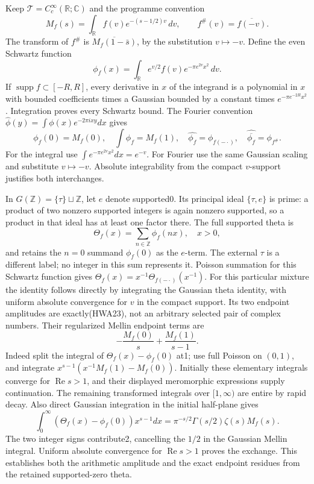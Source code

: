 \documentclass[
  10pt,
  a4paper,
]{article}
\begin{document}
Keep \(\mathcal T=C_c^\infty(\mathbb R;\mathbb C)\) and the programme
convention \[
M_f(s)=\int_{\mathbb R}f(v)e^{-(s-1/2)v}\,dv,
\qquad f^\#(v)=\overline{f(-v)}.
\tag{HWA21}
\] The transform of \(f^\#\) is \(\overline{M_f(1-\bar s)}\), by the
substitution \(v\mapsto-v\). Define the even Schwartz function \[
\phi_f(x)=\int_{\mathbb R}e^{v/2}f(v)e^{-\pi e^{2v}x^2}\,dv.
\tag{HWA22}
\] If \(\operatorname{supp}f\subset[-R,R]\), every derivative in \(x\)
of the integrand is a polynomial in \(x\) with bounded coefficients
times a Gaussian bounded by a constant times \(e^{-\pi e^{-2R}x^2}\).
Integration proves every Schwartz bound. The Fourier convention
\(\widehat\phi(y)=\int\phi(x)e^{-2\pi ixy}dx\) gives \[
\phi_f(0)=M_f(0),\quad \int\phi_f=M_f(1),
\quad\widehat{\phi_f}=\phi_{f(-\cdot)},
\quad\widehat{\overline{\phi_f}}=\phi_{f^\#}.
\tag{HWA23}
\] For the integral use \(\int e^{-\pi e^{2v}x^2}dx=e^{-v}\). For
Fourier use the same Gaussian scaling and substitute \(v\mapsto-v\).
Absolute integrability from the compact \(v\)-support justifies both
interchanges.

In \(G(\mathbb Z)=\{\tau\}\sqcup\mathbb Z\), let \(e\) denote
supported0. Its principal ideal \(\{\tau,e\}\) is prime: a product of
two nonzero supported integers is again nonzero supported, so a product
in that ideal has at least one factor there. The full supported theta is
\[
\Theta_f(x)=\sum_{n\in\mathbb Z}\phi_f(nx),\quad x>0,
\tag{HWA24}
\] and retains the \(n=0\) summand \(\phi_f(0)\) as the \(e\)-term. The
external \(\tau\) is a different label; no integer in this sum
represents it. Poisson summation for this Schwartz function gives
\(\Theta_f(x)=x^{-1}\Theta_{f(-\cdot)}(x^{-1})\). For this particular
mixture the identity follows directly by integrating the Gaussian theta
identity, with uniform absolute convergence for \(v\) in the compact
support. Its two endpoint amplitudes are exactly(HWA23), not an
arbitrary selected pair of complex numbers. Their regularized Mellin
endpoint terms are \[
-\frac{M_f(0)}s+\frac{M_f(1)}{s-1}.
\tag{HWA25}
\] Indeed split the integral of \(\Theta_f(x)-\phi_f(0)\) at1; use full
Poisson on \((0,1)\), and integrate \(x^{s-1}(x^{-1}M_f(1)-M_f(0))\).
Initially these elementary integrals converge for
\(\operatorname{Re}s>1\), and their displayed meromorphic expressions
supply continuation. The remaining transformed integrals over
\([1,\infty)\) are entire by rapid decay. Also direct Gaussian
integration in the initial half-plane gives \[
\int_0^\infty (\Theta_f(x)-\phi_f(0))x^{s-1}dx
=\pi^{-s/2}\Gamma(s/2)\zeta(s)M_f(s).
\tag{HWA26}
\] The two integer signs contribute2, cancelling the \(1/2\) in the
Gaussian Mellin integral. Uniform absolute convergence for
\(\operatorname{Re}s>1\) proves the exchange. This establishes both the
arithmetic amplitude and the exact endpoint residues from the retained
supported-zero theta.
\end{document}
